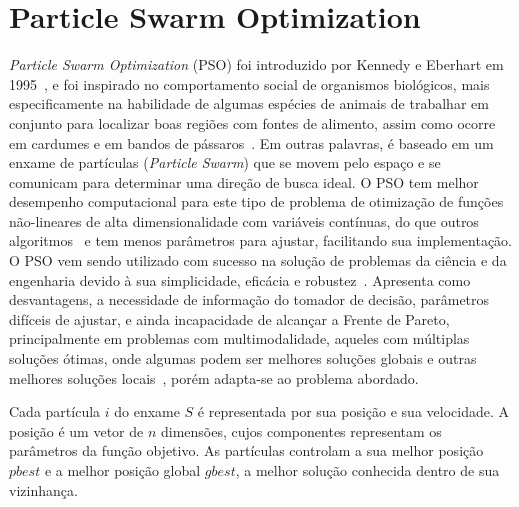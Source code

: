 \section{Particle Swarm Optimization}
\label{sec:PSO}
\textit{Particle Swarm Optimization} (PSO) foi introduzido por Kennedy e Eberhart em 1995~\cite{eberhart1995}, e foi inspirado no comportamento social de organismos biológicos, mais especificamente na habilidade de algumas espécies de animais de trabalhar em conjunto para localizar boas regiões com fontes de alimento, assim como ocorre em cardumes e em bandos de pássaros~\cite{bratton2007}. Em outras palavras, é baseado em um enxame de partículas (\emph{Particle Swarm}) que se movem pelo espaço e se comunicam para determinar uma direção de busca ideal. O PSO tem melhor desempenho computacional para este tipo de problema de otimização de funções não-lineares de alta dimensionalidade com variáveis contínuas, do que outros algoritmos~\cite{eberhart1995,bratton2007,alrashidi2009} e tem menos parâmetros para ajustar, facilitando sua implementação. O PSO vem sendo utilizado com sucesso na solução de problemas da ciência e da engenharia devido à sua simplicidade, eficácia e robustez~\cite{fukuyama1999, ourique2002, sousa2004,van2006,engelbrecht2007, alrashidi2009,rodriguez2014,al2015}. Apresenta como desvantagens, a necessidade de informação do tomador de decisão, parâmetros difíceis de ajustar, e ainda incapacidade de alcançar a Frente de Pareto, principalmente em problemas com multimodalidade, aqueles com múltiplas soluções ótimas, onde algumas podem ser melhores soluções globais e outras melhores soluções locais~\cite{figueiredo2013}, porém adapta-se ao problema abordado.

Cada partícula $ i $ do enxame $ S $ é representada por sua posição e sua velocidade. A posição é um vetor de $ n $ dimensões, cujos componentes representam os parâmetros da função objetivo. As partículas controlam a sua melhor posição $ pbest $ e a melhor posição global $ gbest $, a melhor solução conhecida dentro de sua vizinhança.

